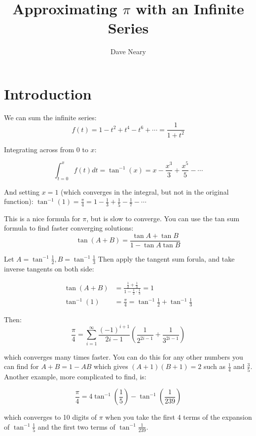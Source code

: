 \documentclass[10pt,oneside,landscape]{article}
\begin{document}
\title{Approximating $\pi$ with an Infinite Series}
\author{Dave Neary}

\maketitle

\section{Introduction}

We can sum the infinite series:
\[f(t) = 1-t^2+t^4-t^6+\cdots = \frac{1}{1+t^2} \]

Integrating across from 0 to $x$:

\[\int_{t=0}^x f(t) dt = \tan^{-1}(x) = x-\frac{x^3}{3}+\frac{x^5}{5} - \cdots\]

And setting $x=1$ (which converges in the integral, but not in the original function):
$\tan^{-1}(1) = \frac{\pi}{4} = 1-\frac{1}{3}+\frac{1}{5}-\frac{1}{7} - \cdots$

\bigskip

This is a nice formula for $\pi$, but is slow to converge. You can use the tan sum formula to
find faster converging solutions:
\[\tan(A+B) = \frac{\tan A + \tan B}{1-\tan A \tan B}\]

Let $A=\tan^{-1} \frac{1}{2}, B=\tan^{-1} \frac{1}{3}$ Then apply the tangent sum forula, and take
inverse tangents on both side:

\begin{align*}
\tan(A+B) &= \frac{\frac{1}{2}+\frac{1}{3}}{1-\frac{1}{2}\cdot\frac{1}{3}} = 1 \\
\tan^{-1}(1) & = \frac{\pi}{4} = \tan^{-1}\frac{1}{2} + \tan^{-1}\frac{1}{3}
\end{align*}

\bigskip

Then:
\[\displaystyle \frac{\pi}{4} = \sum_{i=1}^{\infty} \frac{(-1)^{i+1}}{2i-1} \left( \frac{1}{2^{2i-1}} + \frac{1}{3^{2i-1}}\right)\]

which converges many times faster. You can do this for any other numbers you can find for
$A+B=1-AB$ which gives $(A+1)(B+1) = 2$ such as $\frac{1}{4}$ and $\frac{3}{5}$.
Another example, more complicated to find, is:

\[\frac{\pi}{4} = 4\tan^{-1}\left(\frac{1}{5}\right) - \tan^{-1}\left(\frac{1}{239}\right)\]

which converges to 10 digits of $\pi$ when you take the first 4 terms of the expansion of
$\tan^{-1} \frac{1}{5}$ and the first two terms of $\tan^{-1} \frac{1}{239}$.
\end{document}
